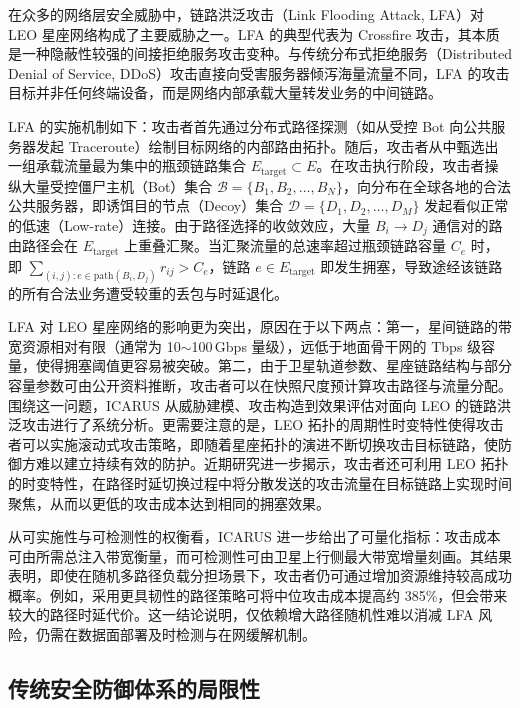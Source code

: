在众多的网络层安全威胁中，链路洪泛攻击（Link Flooding Attack, LFA）对 LEO 星座网络构成了主要威胁之一。LFA 的典型代表为 Crossfire 攻击，其本质是一种隐蔽性较强的间接拒绝服务攻击变种。与传统分布式拒绝服务（Distributed Denial of Service, DDoS）攻击直接向受害服务器倾泻海量流量不同，LFA 的攻击目标并非任何终端设备，而是网络内部承载大量转发业务的中间链路。

LFA 的实施机制如下：攻击者首先通过分布式路径探测（如从受控 Bot 向公共服务器发起 Traceroute）绘制目标网络的内部路由拓扑。随后，攻击者从中甄选出一组承载流量最为集中的瓶颈链路集合 $E_{\text{target}} \subset E$。在攻击执行阶段，攻击者操纵大量受控僵尸主机（Bot）集合 $\mathcal{B}=\{B_1, B_2, \ldots, B_N\}$，向分布在全球各地的合法公共服务器，即诱饵目的节点（Decoy）集合 $\mathcal{D}=\{D_1, D_2, \ldots, D_M\}$ 发起看似正常的低速（Low-rate）连接。由于路径选择的收敛效应，大量 $B_i \rightarrow D_j$ 通信对的路由路径会在 $E_{\text{target}}$ 上重叠汇聚。当汇聚流量的总速率超过瓶颈链路容量 $C_{e}$ 时，即 $\sum_{(i,j): e \in \text{path}(B_i, D_j)} r_{ij} > C_{e}$，链路 $e \in E_{\text{target}}$ 即发生拥塞，导致途经该链路的所有合法业务遭受较重的丢包与时延退化。

LFA 对 LEO 星座网络的影响更为突出，原因在于以下两点：第一，星间链路的带宽资源相对有限（通常为 10$\sim$100\,Gbps 量级），远低于地面骨干网的 Tbps 级容量，使得拥塞阈值更容易被突破。第二，由于卫星轨道参数、星座链路结构与部分容量参数可由公开资料推断，攻击者可以在快照尺度预计算攻击路径与流量分配。围绕这一问题，ICARUS 从威胁建模、攻击构造到效果评估对面向 LEO 的链路洪泛攻击进行了系统分析。更需要注意的是，LEO 拓扑的周期性时变特性使得攻击者可以实施滚动式攻击策略，即随着星座拓扑的演进不断切换攻击目标链路，使防御方难以建立持续有效的防护。近期研究进一步揭示，攻击者还可利用 LEO 拓扑的时变特性，在路径时延切换过程中将分散发送的攻击流量在目标链路上实现时间聚焦，从而以更低的攻击成本达到相同的拥塞效果。

从可实施性与可检测性的权衡看，ICARUS 进一步给出了可量化指标：攻击成本可由所需总注入带宽衡量，而可检测性可由卫星上行侧最大带宽增量刻画。其结果表明，即使在随机多路径负载分担场景下，攻击者仍可通过增加资源维持较高成功概率。例如，采用更具韧性的路径策略可将中位攻击成本提高约 385\%，但会带来较大的路径时延代价。这一结论说明，仅依赖增大路径随机性难以消减 LFA 风险，仍需在数据面部署及时检测与在网缓解机制。

\subsection{传统安全防御体系的局限性}

